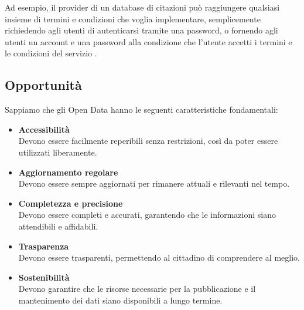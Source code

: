 Ad esempio, il provider di un database di citazioni può raggiungere qualsiasi insieme di termini e condizioni che voglia implementare, semplicemente richiedendo agli utenti di autenticarsi tramite una password, o fornendo agli utenti un account e una password alla condizione che l'utente accetti i termini e le condizioni del servizio \cite{OpenDataHandbook_LegalRights}.





\subsection{Opportunità}
Sappiamo che gli Open Data hanno le seguenti caratteristiche fondamentali:
\begin{itemize}
    \item \textbf{Accessibilità}\\
    Devono essere facilmente reperibili senza restrizioni, così da poter essere utilizzati liberamente.
    \item \textbf{Aggiornamento regolare}\\
    Devono essere sempre aggiornati per rimanere attuali e rilevanti nel tempo.
    \item \textbf{Completezza e precisione}\\
    Devono essere completi e accurati, garantendo che le informazioni siano attendibili e affidabili.
    \item \textbf{Trasparenza}\\
    Devono essere trasparenti, permettendo al cittadino di comprendere al meglio.
    \item \textbf{Sostenibilità}\\
    Devono garantire che le risorse necessarie per la pubblicazione e il mantenimento dei dati siano disponibili a lungo termine.
\end{itemize}

